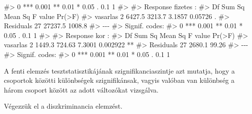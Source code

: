 \documentclass[
  letterpaper,
]{krantz}
\makeatletter
\newenvironment{Shaded}{\begin{snugshade}}{\end{snugshade}}
\newcommand{\CommentTok}[1]{\textcolor[rgb]{0.37,0.37,0.37}{#1}}
\newenvironment{kframe}{%
\medskip{}
\setlength{\fboxsep}{.8em}
 \def\at@end@of@kframe{}%
 \ifinner\ifhmode%
  \def\at@end@of@kframe{\end{minipage}}%
  \begin{minipage}{\columnwidth}%
 \fi\fi%
 \def\FrameCommand##1{\hskip\@totalleftmargin \hskip-\fboxsep
 \colorbox{shadecolor}{##1}\hskip-\fboxsep
     \hskip-\linewidth \hskip-\@totalleftmargin \hskip\columnwidth}%
 \MakeFramed {\advance\hsize-\width
   \@totalleftmargin\z@ \linewidth\hsize
   \@setminipage}}%
 {\par\unskip\endMakeFramed%
 \at@end@of@kframe}
\renewenvironment{Shaded}{\begin{kframe}}{\end{kframe}}
\makeatother
\begin{document}
\begin{Shaded}
\begin{Highlighting}[]
\CommentTok{\#\textgreater{} 0 \textquotesingle{}***\textquotesingle{} 0.001 \textquotesingle{}**\textquotesingle{} 0.01 \textquotesingle{}*\textquotesingle{} 0.05 \textquotesingle{}.\textquotesingle{} 0.1 \textquotesingle{} \textquotesingle{} 1}
\CommentTok{\#\textgreater{} }
\CommentTok{\#\textgreater{}  Response fizetes :}
\CommentTok{\#\textgreater{}             Df  Sum Sq Mean Sq F value  Pr(\textgreater{}F)  }
\CommentTok{\#\textgreater{} vasarlas     2  6427.5  3213.7  3.1857 0.05726 .}
\CommentTok{\#\textgreater{} Residuals   27 27237.5  1008.8                  }
\CommentTok{\#\textgreater{} {-}{-}{-}}
\CommentTok{\#\textgreater{} Signif. codes:  }
\CommentTok{\#\textgreater{} 0 \textquotesingle{}***\textquotesingle{} 0.001 \textquotesingle{}**\textquotesingle{} 0.01 \textquotesingle{}*\textquotesingle{} 0.05 \textquotesingle{}.\textquotesingle{} 0.1 \textquotesingle{} \textquotesingle{} 1}
\CommentTok{\#\textgreater{} }
\CommentTok{\#\textgreater{}  Response kor :}
\CommentTok{\#\textgreater{}             Df Sum Sq Mean Sq F value   Pr(\textgreater{}F)   }
\CommentTok{\#\textgreater{} vasarlas     2 1449.3  724.63  7.3001 0.002922 **}
\CommentTok{\#\textgreater{} Residuals   27 2680.1   99.26                    }
\CommentTok{\#\textgreater{} {-}{-}{-}}
\CommentTok{\#\textgreater{} Signif. codes:  }
\CommentTok{\#\textgreater{} 0 \textquotesingle{}***\textquotesingle{} 0.001 \textquotesingle{}**\textquotesingle{} 0.01 \textquotesingle{}*\textquotesingle{} 0.05 \textquotesingle{}.\textquotesingle{} 0.1 \textquotesingle{} \textquotesingle{} 1}
\end{Highlighting}
\end{Shaded}

A fenti elemzés tesztstatisztikájának szignifikanciaszintje azt mutatja,
hogy a csoportok közötti különbségek szignifikánsak, vagyis valóban van
különbség a három csoport között az adott változókat vizsgálva.

Végezzük el a diszkriminancia elemzést.
\end{document}
